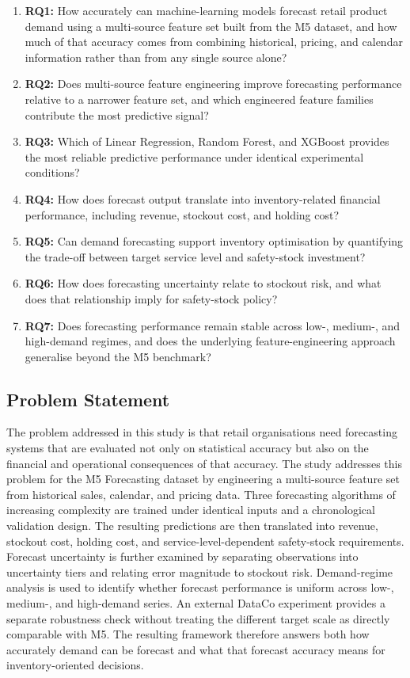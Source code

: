 \begin{enumerate}
    \item \textbf{RQ1:} How accurately can machine-learning models forecast retail product demand using a multi-source feature set built from the M5 dataset, and how much of that accuracy comes from combining historical, pricing, and calendar information rather than from any single source alone?
    \item \textbf{RQ2:} Does multi-source feature engineering improve forecasting performance relative to a narrower feature set, and which engineered feature families contribute the most predictive signal?
    \item \textbf{RQ3:} Which of Linear Regression, Random Forest, and XGBoost provides the most reliable predictive performance under identical experimental conditions?
    \item \textbf{RQ4:} How does forecast output translate into inventory-related financial performance, including revenue, stockout cost, and holding cost?
    \item \textbf{RQ5:} Can demand forecasting support inventory optimisation by quantifying the trade-off between target service level and safety-stock investment?
    \item \textbf{RQ6:} How does forecasting uncertainty relate to stockout risk, and what does that relationship imply for safety-stock policy?
    \item \textbf{RQ7:} Does forecasting performance remain stable across low-, medium-, and high-demand regimes, and does the underlying feature-engineering approach generalise beyond the M5 benchmark?
\end{enumerate}

\subsection{Problem Statement}

The problem addressed in this study is that retail organisations need forecasting systems that are evaluated not only on statistical accuracy but also on the financial and operational consequences of that accuracy.
The study addresses this problem for the M5 Forecasting dataset by engineering a multi-source feature set from historical sales, calendar, and pricing data.
Three forecasting algorithms of increasing complexity are trained under identical inputs and a chronological validation design.
The resulting predictions are then translated into revenue, stockout cost, holding cost, and service-level-dependent safety-stock requirements.
Forecast uncertainty is further examined by separating observations into uncertainty tiers and relating error magnitude to stockout risk.
Demand-regime analysis is used to identify whether forecast performance is uniform across low-, medium-, and high-demand series.
An external DataCo experiment provides a separate robustness check without treating the different target scale as directly comparable with M5.
The resulting framework therefore answers both how accurately demand can be forecast and what that forecast accuracy means for inventory-oriented decisions.

